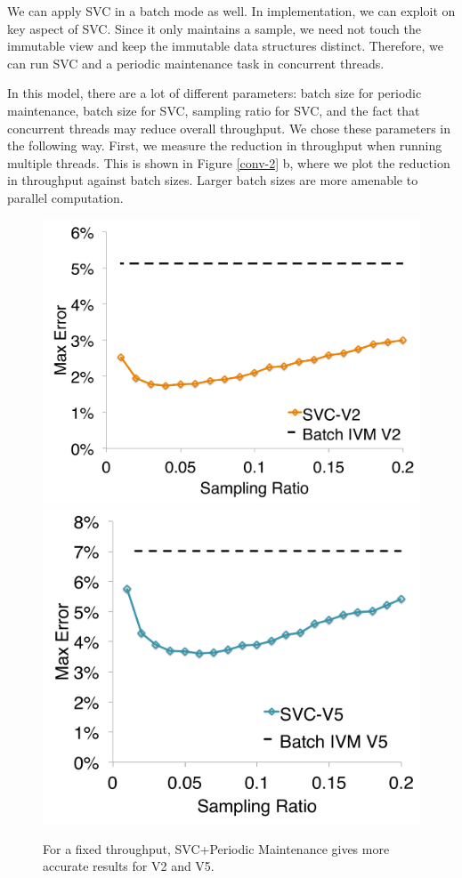 We can apply SVC in a batch mode as well.
In implementation, we can exploit on key aspect of SVC.
Since it only maintains a sample, we need not touch the immutable view and keep the immutable data structures
distinct.
Therefore, we can run SVC and a periodic maintenance task in concurrent threads.

In this model, there are a lot of different parameters: batch size for periodic maintenance, batch size for SVC, sampling ratio for SVC, and the fact that concurrent threads may reduce overall throughput.
We chose these parameters in the following way.
First, we measure the reduction in throughput when running multiple threads.
This is shown in Figure \ref{conv-2} b, where we plot the reduction in throughput against batch sizes.
Larger batch sizes are more amenable to parallel computation.

\begin{figure}[t]
\centering
 \includegraphics[scale=0.14]{exp/con_5.pdf}
 \includegraphics[scale=0.14]{exp/con_6.pdf}
 \caption{For a fixed throughput, SVC+Periodic Maintenance gives more accurate results for V2 and V5. \label{conv-4}} 
\end{figure}

